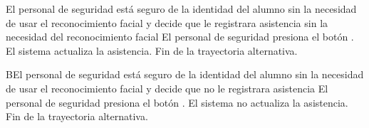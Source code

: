 \begin{UCtrayectoriaA}{}{El personal de seguridad está seguro de la identidad del alumno sin la necesidad de usar el reconocimiento facial y decide que le registrara asistencia sin la necesidad del reconocimiento facial}
\UCpaso[\UCactor] El personal de seguridad presiona el botón .
\UCpaso El sistema actualiza la asistencia.
\UCpaso Fin de la trayectoria alternativa.
\end{UCtrayectoriaA}
\begin{UCtrayectoriaA}{B}{El personal de seguridad está seguro de la identidad del alumno sin la necesidad de usar el reconocimiento facial y decide que no le registrara asistencia}
\UCpaso[\UCactor] El personal de seguridad presiona el botón .
\UCpaso El sistema no actualiza la asistencia.
\UCpaso Fin de la trayectoria alternativa.
\end{UCtrayectoriaA}  

